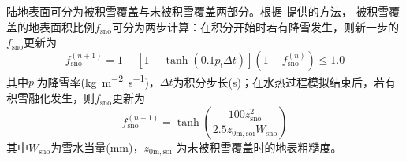 陆地表面可分为被积雪覆盖与未被积雪覆盖两部分。根据 \citet{swenson2012new}提供的方法，
被积雪覆盖的地表面积比例$f_{\mathrm{sno}}$可分为两步计算：在积分开始时若有降雪发生，则新一步的$f_{\mathrm{sno}}$更新为
\begin{equation}
  f_{\mathrm{{sno }}}^{(n+1)}=1-\left[1-\tanh\left(0.1 p_{\mathrm{i}} \Delta t\right)\right]\left(1-f_{\mathrm{{sno }}}^{(n)}\right) \leqslant 1.0
\end{equation}
其中$p_{\mathrm {i}}$为降雪率(\unit{kg.m^{-2}.s^{-1}})，$\Delta t$为积分步长(s)；在水热过程模拟结束后，若有积雪融化发生，则$f_{\mathrm{sno}}$更新为
\begin{equation}
  f_{\mathrm{sno}}^{(n+1)}=\tanh{\left(\frac{100 z_{\mathrm{s n o}}^{2}}{2.5 z_{\mathrm{0 m, s o i}} W_{\mathrm{sno}}}\right)}
\end{equation}
其中$W_{\mathrm{sno}}$为雪水当量(mm)，$z_{\mathrm{0m,soi}}$ 为未被积雪覆盖时的地表粗糙度。


